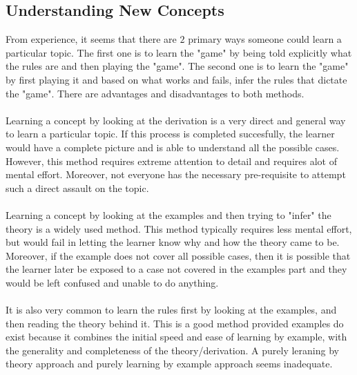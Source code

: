 \documentclass[a4paper, 12pt]{report}
\begin{document}
\begin{center}
\subsection{Understanding New Concepts}
\begin{comment}
\end{comment}
From experience, it seems that there are $2$ primary ways someone could learn a particular topic. 
The first one is to learn the "game" by being told explicitly what the rules are and then playing the "game".
The second one is to learn the "game" by first playing it and based on what works and fails, infer the rules that dictate the "game".
There are advantages and disadvantages to both methods.
\\~\\Learning a concept by looking at the derivation is a very direct and general way to learn a particular topic.
If this process is completed succesfully, the learner would have a complete picture and is able to understand all the possible cases.
However, this method requires extreme attention to detail and requires alot of mental effort. 
Moreover, not everyone has the necessary pre-requisite to attempt such a direct assault on the topic.
\\~\\Learning a concept by looking at the examples and then trying to "infer" the theory is a widely used method.
This method typically requires less mental effort, but would fail in letting the learner know why and how the theory came to be.
Moreover, if the example does not cover all possible cases, then it is possible that the learner later be exposed to a case not covered in the examples part and they would be left confused and unable to do anything.
\\~\\It is also very common to learn the rules first by looking at the examples, and then reading the theory behind it.
This is a good method provided examples do exist because it combines the initial speed and ease of learning by example, with the generality and completeness of the theory/derivation.
A purely leraning by theory approach and purely learning by example approach seems inadequate.


\end{center}
\end{document}
